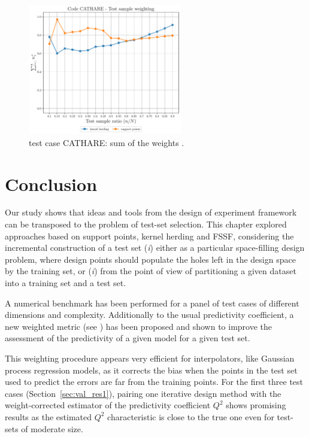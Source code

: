 \begin{figure}
  \centering
  \includegraphics[width=0.6\textwidth]{./part2/figures/SIS/cathareC2_weights.pdf}
  \caption{test case CATHARE: sum of the weights .}
  \label{fig:catharec2_weights}
\end{figure}




\section{Conclusion}\label{sec:val_conclusion}

Our study shows that ideas and tools from the design of experiment framework can be transposed to the problem of test-set selection. 
This chapter explored approaches based on support points, kernel herding and FSSF, considering the incremental construction of a test set (\textit{i}) either as a particular space-filling design problem, where design points should populate the holes left in the design space by the training set, or (\textit{i}) from the point of view of partitioning a given dataset into a training set and a test set. 

A numerical benchmark has been performed for a panel of test cases of different dimensions and complexity. 
Additionally to the usual predictivity coefficient, a new weighted metric (see \citealp{PR2021a}) has been proposed and shown to improve the assessment of the predictivity of a given model for a given test set. 

This weighting procedure appears very efficient for interpolators, like Gaussian process regression models, as it corrects the bias when the points in the test set used to predict the errors are far from the training points. 
For the first three test cases (Section~\ref{sec:val_res1}), pairing one iterative design method with the weight-corrected estimator of the predictivity coefficient $Q^2$ shows promising results as the estimated $Q^2$ characteristic is close to the true one even for test-sets of moderate size. 

